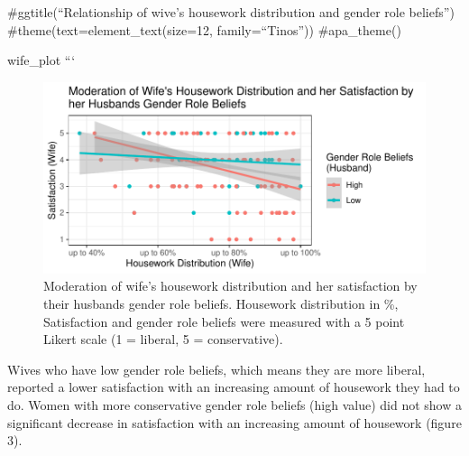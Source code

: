 \documentclass[
  man,floatsintext]{apa6}
\begin{document}
\#ggtitle(``Relationship of wive's housework distribution and gender role beliefs'')
\#theme(text=element\_text(size=12, family=``Tinos''))
\#apa\_theme()

wife\_plot
```



\begin{figure}
\centering
\includegraphics{results_files/figure-latex/unnamed-chunk-12-1.pdf}
\caption{\label{fig:unnamed-chunk-12}Moderation of wife's housework distribution and her satisfaction by their husbands gender role beliefs. Housework distribution in \%, Satisfaction and gender role beliefs were measured with a 5 point Likert scale (1 = liberal, 5 = conservative).}
\end{figure}

Wives who have low gender role beliefs, which means they are more liberal, reported a lower satisfaction with an increasing amount of housework they had to do. Women with more conservative gender role beliefs (high value) did not show a significant decrease in satisfaction with an increasing amount of housework (figure 3).
\end{document}
